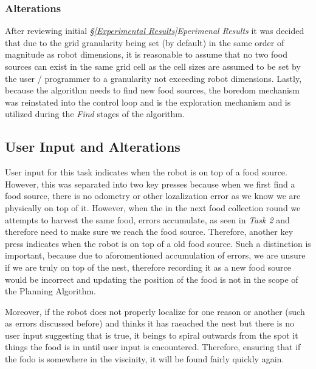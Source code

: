 \documentclass[11pt, a4paper]{article}
\begin{document}
\subsubsection{Alterations}

After reviewing initial \textit{\S\ref{Experimental Results}Eperimenal Results} it was decided that due to the grid granularity being set (by default) in the same order of magnitude as robot dimensions, it is reasonable to assume that no two food sources can exist in the same grid cell as the cell sizes are assumed to be set by the user / programmer to a granularity not exceeding robot dimensions. Lastly, because the algorithm needs to find new food sources, the boredom mechanism \cite{task1_report} was reinstated into the control loop and is the exploration mechanism and is utilized during the \textit{Find} stages of the algorithm. 



\subsection{User Input and Alterations}

User input for this task indicates when the robot is on top of a food source. However, this was separated into two key presses because when we first find a food source, there is no odometry or other lozalization error as we know we are physically on top of it. However, when the in the next food collection round we attempts to harvest the same food, errors accumulate, as seen in \textit{Task 2}\cite{task2_report} and therefore need to make sure we reach the food source. Therefore, another key press indicates when the robot is on top of a old food source. Such a distinction is important, because due to aforomentioned accumulation of errors, we are unsure if we are truly on top of the nest, therefore recording it as a new food source would be incorrect and updating the position of the food is not in the scope of the Planning Algorithm. 

Moreover, if the robot does not properly localize for one reason or another (such as errors discussed before) and thinks it has raeached the nest but there is no user input suggesting that is true, it beings to spiral outwards from the spot it things the food is in until user input is encountered. Therefore, ensuring that if the fodo is somewhere in the viscinity, it will be found fairly quickly again. 
\end{document}

